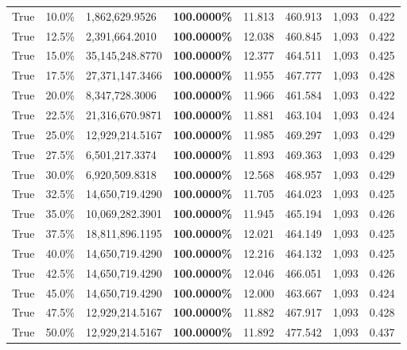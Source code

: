 \begin{table}[H]
\begin{tabular}{lllrllll}
\cline{1-8}
True & 10.0\% & 1,862,629.9526 & \bfseries \color{red} 100.0000\% & 11.813 & 460.913 & 1,093 & 0.422 \\
\cline{1-8}
True & 12.5\% & 2,391,664.2010 & \bfseries \color{red} 100.0000\% & 12.038 & 460.845 & 1,093 & 0.422 \\
\cline{1-8}
True & 15.0\% & 35,145,248.8770 & \bfseries \color{red} 100.0000\% & 12.377 & 464.511 & 1,093 & 0.425 \\
\cline{1-8}
True & 17.5\% & 27,371,147.3466 & \bfseries \color{red} 100.0000\% & 11.955 & 467.777 & 1,093 & 0.428 \\
\cline{1-8}
True & 20.0\% & 8,347,728.3006 & \bfseries \color{red} 100.0000\% & 11.966 & 461.584 & 1,093 & 0.422 \\
\cline{1-8}
True & 22.5\% & 21,316,670.9871 & \bfseries \color{red} 100.0000\% & 11.881 & 463.104 & 1,093 & 0.424 \\
\cline{1-8}
True & 25.0\% & 12,929,214.5167 & \bfseries \color{red} 100.0000\% & 11.985 & 469.297 & 1,093 & 0.429 \\
\cline{1-8}
True & 27.5\% & 6,501,217.3374 & \bfseries \color{red} 100.0000\% & 11.893 & 469.363 & 1,093 & 0.429 \\
\cline{1-8}
True & 30.0\% & 6,920,509.8318 & \bfseries \color{red} 100.0000\% & 12.568 & 468.957 & 1,093 & 0.429 \\
\cline{1-8}
True & 32.5\% & 14,650,719.4290 & \bfseries \color{red} 100.0000\% & 11.705 & 464.023 & 1,093 & 0.425 \\
\cline{1-8}
True & 35.0\% & 10,069,282.3901 & \bfseries \color{red} 100.0000\% & 11.945 & 465.194 & 1,093 & 0.426 \\
\cline{1-8}
True & 37.5\% & 18,811,896.1195 & \bfseries \color{red} 100.0000\% & 12.021 & 464.149 & 1,093 & 0.425 \\
\cline{1-8}
True & 40.0\% & 14,650,719.4290 & \bfseries \color{red} 100.0000\% & 12.216 & 464.132 & 1,093 & 0.425 \\
\cline{1-8}
True & 42.5\% & 14,650,719.4290 & \bfseries \color{red} 100.0000\% & 12.046 & 466.051 & 1,093 & 0.426 \\
\cline{1-8}
True & 45.0\% & 14,650,719.4290 & \bfseries \color{red} 100.0000\% & 12.000 & 463.667 & 1,093 & 0.424 \\
\cline{1-8}
True & 47.5\% & 12,929,214.5167 & \bfseries \color{red} 100.0000\% & 11.882 & 467.917 & 1,093 & 0.428 \\
\cline{1-8}
True & 50.0\% & 12,929,214.5167 & \bfseries \color{red} 100.0000\% & 11.892 & 477.542 & 1,093 & 0.437 \\

\end{tabular}
\end{table}

